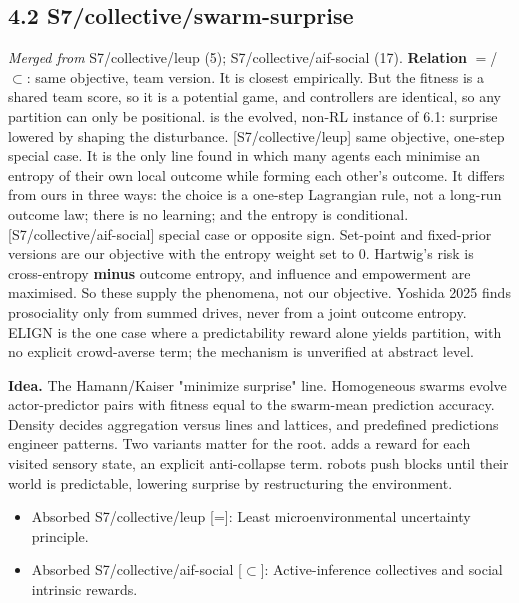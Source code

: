 \documentclass[10pt]{article}
\begin{document}
\subsection{4.2 S7/collective/swarm-surprise}\label{node:S7-S7-collective-swarm-surprise}
\textit{Merged from} S7/collective/leup (5); S7/collective/aif-social (17). \textbf{Relation} $=$/$\subset$: same objective, team version. It is closest empirically. But the fitness is a shared team score, so it is a potential game, and controllers are identical, so any partition can only be positional. \citet{Kaiser-self19b} is the evolved, non-RL instance of 6.1: surprise lowered by shaping the disturbance. [S7/collective/leup] same objective, one-step special case. It is the only line found in which many agents each minimise an entropy of their own local outcome while forming each other's outcome. It differs from ours in three ways: the choice is a one-step Lagrangian rule, not a long-run outcome law; there is no learning; and the entropy is conditional. [S7/collective/aif-social] special case or opposite sign. Set-point and fixed-prior versions are our objective with the entropy weight set to 0. Hartwig's risk is cross-entropy \textbf{minus} outcome entropy, and influence and empowerment are maximised. So these supply the phenomena, not our objective. Yoshida 2025 finds prosociality only from summed drives, never from a joint outcome entropy. ELIGN is the one case where a predictability reward alone yields partition, with no explicit crowd-averse term; the mechanism is unverified at abstract level.

\textbf{Idea.} The Hamann/Kaiser "minimize surprise" line. Homogeneous swarms evolve actor-predictor pairs with fitness equal to the swarm-mean prediction accuracy. Density decides aggregation versus lines and lattices, and predefined predictions engineer patterns. Two variants matter for the root. \citet{Zahadat-evolving15b} adds a reward for each visited sensory state, an explicit anti-collapse term. \citet{Kaiser-self19b} robots push blocks until their world is predictable, lowering surprise by restructuring the environment.
\begin{itemize}[nosep,leftmargin=1.2em]
\item Absorbed S7/collective/leup [=]: Least microenvironmental uncertainty principle.
\item Absorbed S7/collective/aif-social [\ensuremath{\subset}]: Active-inference collectives and social intrinsic rewards.
\end{itemize}
\end{document}
